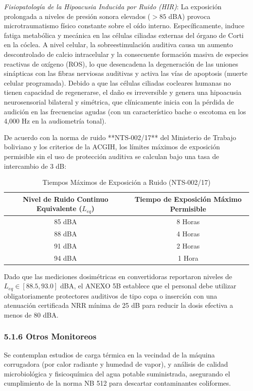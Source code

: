 \documentclass[11pt, letterpaper]{article}
\begin{document}
\textit{Fisiopatología de la Hipoacusia Inducida por Ruido (HIR)}: La exposición prolongada a niveles de presión sonora elevados ($>85$ dBA) provoca microtraumatismo físico constante sobre el oído interno. Específicamente, induce fatiga metabólica y mecánica en las células ciliadas externas del órgano de Corti en la cóclea. A nivel celular, la sobreestimulación auditiva causa un aumento descontrolado de calcio intracelular y la consecuente formación masiva de especies reactivas de oxígeno (ROS), lo que desencadena la degeneración de las uniones sinápticas con las fibras nerviosas auditivas y activa las vías de apoptosis (muerte celular programada). Debido a que las células ciliadas cocleares humanas no tienen capacidad de regenerarse, el daño es irreversible y genera una hipoacusia neurosensorial bilateral y simétrica, que clínicamente inicia con la pérdida de audición en las frecuencias agudas (con un característico bache o escotoma en los 4,000 Hz en la audiometría tonal).

De acuerdo con la norma de ruido **NTS-002/17** del Ministerio de Trabajo boliviano y los criterios de la ACGIH, los límites máximos de exposición permisible sin el uso de protección auditiva se calculan bajo una tasa de intercambio de 3 dB:

\begin{table}[H]
    \centering
    \small
    \caption{Tiempos Máximos de Exposición a Ruido (NTS-002/17)}
    \begin{tabular}{cc}
        \toprule
        \textbf{Nivel de Ruido Continuo Equivalente ($L_{eq}$)} & \textbf{Tiempo de Exposición Máximo Permisible} \\
        \midrule
        85 dBA & 8 Horas \\
        88 dBA & 4 Horas \\
        91 dBA & 2 Horas \\
        94 dBA & 1 Hora \\
        \bottomrule
    \end{tabular}
\end{table}

Dado que las mediciones dosimétricas en convertidoras reportaron niveles de $L_{eq} \in [88.5, 93.0]$ dBA, el ANEXO 5B establece que el personal debe utilizar obligatoriamente protectores auditivos de tipo copa o inserción con una atenuación certificada NRR mínima de 25 dB para reducir la dosis efectiva a menos de 80 dBA.

\subsubsection{5.1.6 Otros Monitoreos}
Se contemplan estudios de carga térmica en la vecindad de la máquina corrugadora (por calor radiante y humedad de vapor), y análisis de calidad microbiológica y fisicoquímica del agua potable suministrada, asegurando el cumplimiento de la norma NB 512 para descartar contaminantes coliformes.
\end{document}
